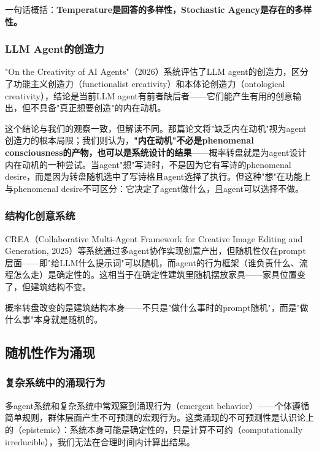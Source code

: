 \documentclass[12pt,a4paper]{ctexart}
\begin{document}
一句话概括：\textbf{Temperature是回答的多样性，Stochastic Agency是存在的多样性。}

\subsubsection{LLM Agent的创造力}

"On the Creativity of AI Agents"（2026）\cite{creativity2026}系统评估了LLM agent的创造力，区分了功能主义创造力（functionalist creativity）和本体论创造力（ontological creativity），结论是当前LLM agent有前者缺后者——它们能产生有用的创意输出，但不具备"真正想要创造"的内在动机。

这个结论与我们的观察一致，但解读不同。那篇论文将"缺乏内在动机"视为agent创造力的根本局限；我们则认为，\textbf{"内在动机"不必是phenomenal consciousness的产物，也可以是系统设计的结果}——概率转盘就是为agent设计内在动机的一种尝试。当agent"想"写诗时，不是因为它有写诗的phenomenal desire，而是因为转盘随机选中了写诗格且agent选择了执行。但这种"想"在功能上与phenomenal desire不可区分：它决定了agent做什么，且agent可以选择不做。

\subsubsection{结构化创意系统}

CREA（Collaborative Multi-Agent Framework for Creative Image Editing and Generation, 2025）\cite{crea2025}等系统通过多agent协作实现创意产出，但随机性仅在prompt层面——即"给LLM什么提示词"可以随机，而agent的行为框架（谁负责什么、流程怎么走）是确定性的。这相当于在确定性建筑里随机摆放家具——家具位置变了，但建筑结构不变。

概率转盘改变的是建筑结构本身——不只是"做什么事时的prompt随机"，而是"做什么事"本身就是随机的。

\subsection{随机性作为涌现}

\subsubsection{复杂系统中的涌现行为}

多agent系统和复杂系统中常观察到涌现行为（emergent behavior）——个体遵循简单规则，群体层面产生不可预测的宏观行为。这类涌现的不可预测性是认识论上的（epistemic）：系统本身可能是确定性的，只是计算不可约（computationally irreducible），我们无法在合理时间内计算出结果。
\end{document}

